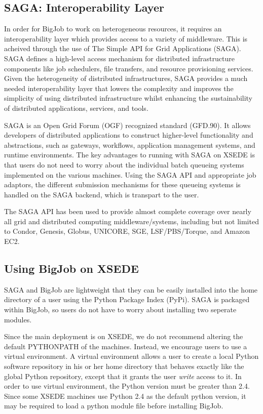\documentclass{sig-alternate}
\begin{document}
\subsection{SAGA: Interoperability Layer}

In order for BigJob to work on heterogeneous resources, it requires an
interoperability layer which provides access to a variety of
middleware.  This is acheived through the use of The Simple API for Grid Applications (SAGA).
SAGA defines a 
high-level access mechanism for distributed infrastructure components 
like job schedulers, file transfers, and resource provisioning services. 
Given the heterogeneity of distributed infrastructures, SAGA provides 
a much needed interoperability layer that lowers the complexity and 
improves the simplicity of using distributed infrastructure whilst 
enhancing the sustainability of distributed applications, services, and tools.

SAGA is an Open Grid Forum (OGF) recognized standard (GFD.90). 
It allows developers of distributed applications to construct
higher-level functionality and abstractions, such as
gateways, workflows, application management systems, and runtime
environments. The key advantages to running with SAGA on XSEDE
is that users do not need to worry about the individual batch
queueing systems implemented on the various machines. Using the 
SAGA API and appropriate job adaptors, the different submission
mechanisms for these queueing systems is handled on the SAGA backend,
which is transpart to the user.

The SAGA API has been used to provide almost complete
coverage over nearly all grid and distributed computing
middleware/systems, including but not limited to Condor, Genesis,
Globus, UNICORE, SGE, LSF/PBS/Torque, and Amazon EC2.

\subsection{Using BigJob on XSEDE}

SAGA and BigJob are lightweight that they can be easily installed into
the home directory of a user using the Python Package Index
(PyPi). SAGA is packaged within BigJob, so users do not have to worry
about installing two seperate modules.

Since the main deployment is on XSEDE, we do not recommend altering
the default PYTHONPATH of the machines. Instead, we encourage users to
use a virtual environment. A virtual environment allows a user to
create a local Python software repository in his or her home directory
that behaves exactly like the global Python repository, except that it
grants the user \textit{write} access to it. In order to use virtual
environment, the Python version must be greater than 2.4. Since some
XSEDE machines use Python 2.4 as the default python version, it may be
required to load a python module file before installing BigJob.
\end{document}
